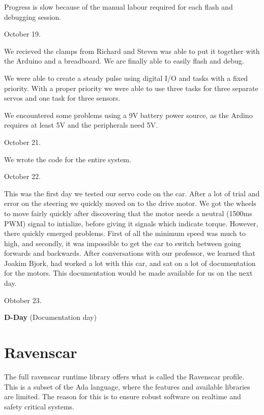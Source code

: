 \documentclass{article}
\begin{document}
Progress is slow because of the manual labour required for each flash and debugging session.
\vspace{5mm}

October 19.

We recieved the clamps from Richard and Steven was able to put it together with the Arduino and a breadboard. We are finally able to easily flash and debug.

We were able to create a steady pulse using digital I/O and tasks with a fixed priority. With a proper priority we were able to use three tasks for three separate servos and one task for three sensors.

We encountered some problems using a 9V battery power source, as the Ardino requires at least 5V and the peripherals need 5V.


\vspace{5mm}
October 21.

We wrote the code for the entire system.


\vspace{5mm}
October 22.

This was the first day we tested our servo code on the car. After a lot of trial and error on the steering we quickly moved on to the drive motor. We got the wheels to move fairly quickly after discovering that the motor needs a neutral (1500ms PWM) signal to intialize, before giving it signals which indicate torque. However, there quickly emerged problems. First of all the minimum speed was much to high, and secondly, it was impossible to get the car to switch between going forwards and backwards. After conversations with our professor, we learned that Joakim Bjork, had worked a lot with this car, and sat on a lot of documentation for the motors. This documentation would be made available for us on the next day.

\vspace{5mm}

Obtober 23.

\textbf{D-Day} (Documentation day)

\section{Ravenscar}

The full ravenscar runtime library offers what is called the Ravenscar profile. This is a subset of the Ada language, where the features and available libraries are limited. The reason for this is to ensure robust software on realtime and safety critical systems.
\end{document}
